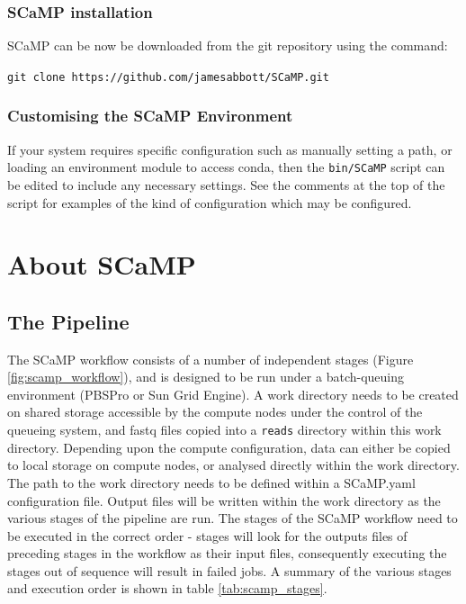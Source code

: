 \documentclass[a4paper,10pt]{article}
\begin{document}
\subsubsection{SCaMP installation}

SCaMP can be now be downloaded from the git repository using the command:                                           

{\tt git clone https://github.com/jamesabbott/SCaMP.git}

\subsubsection{Customising the SCaMP Environment}

If your system requires specific configuration such as manually setting a path,
or loading an environment module to access conda, then the {\tt bin/SCaMP}
script can be edited to include any necessary settings. See the comments at the
top of the script for examples of the kind of configuration which may be
configured.

\section{About SCaMP}

\subsection{The Pipeline} \label{pipeline}

The SCaMP workflow consists of a number of independent stages
(Figure \ref{fig:scamp_workflow}), and is designed to be run under a batch-queuing
environment (PBSPro or Sun Grid Engine). A work directory needs to be created
on shared storage accessible by the compute nodes under the control of the
queueing system, and fastq files copied into a {\tt reads} directory within
this work directory. Depending upon the compute configuration, data can either
be copied to local storage on compute nodes, or analysed directly within the
work directory. The path to the work directory needs to be defined within a
SCaMP.yaml configuration file. Output files will be written within the work
directory as the various stages of the pipeline are run. The stages of the
SCaMP workflow need to be executed in the correct order - stages will look for
the outputs files of preceding stages in the workflow as their input files,
consequently executing the stages out of sequence will result in failed jobs. A
summary of the various stages and execution order is shown in table
\ref{tab:scamp_stages}. 
\end{document}
